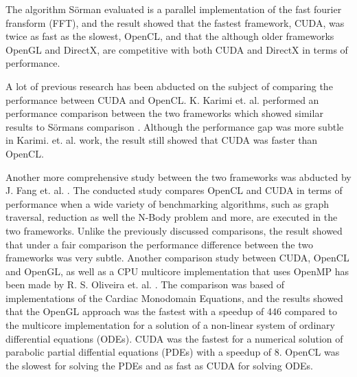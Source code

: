The algorithm Sörman evaluated is a parallel implementation of the fast fourier fransform (FFT), and the result showed that the fastest framework, CUDA, was twice as fast as the slowest, OpenCL, and that the although older frameworks OpenGL and DirectX, are competitive with both CUDA and DirectX in terms of performance.

A lot of previous research has been abducted on the subject of comparing the performance between CUDA and OpenCL. K. Karimi et. al. performed an performance comparison between the two frameworks which showed similar results to Sörmans comparison \cite{karimi2010performance}. Although the performance gap was more subtle in Karimi. et. al. work, the result still showed that CUDA was faster than OpenCL. 

Another more comprehensive study between the two frameworks was abducted by J. Fang et. al. \cite{fang2011comprehensive}. The conducted study compares OpenCL and CUDA in terms of performance when a wide variety of benchmarking algorithms, such as graph traversal, reduction as well the N-Body problem and more, are executed in the two frameworks. Unlike the previously discussed comparisons, the result showed that under a fair comparison the performance difference between the two frameworks was very subtle. 
Another comparison study between CUDA, OpenCL and OpenGL, as well as a CPU multicore implementation that uses OpenMP has been made by R. S. Oliveira et. al. \cite{oliveira2011comparing}. The comparison was based of implementations of the Cardiac Monodomain Equations, and the results showed that the OpenGL approach was the fastest with a speedup of 446 compared to the multicore implementation for a solution of a non-linear system of ordinary differential equations (ODEs). CUDA was the fastest for a numerical solution of parabolic partial diffential equations (PDEs) with a speedup of 8. OpenCL was the slowest for solving the PDEs and as fast as CUDA for solving ODEs.


